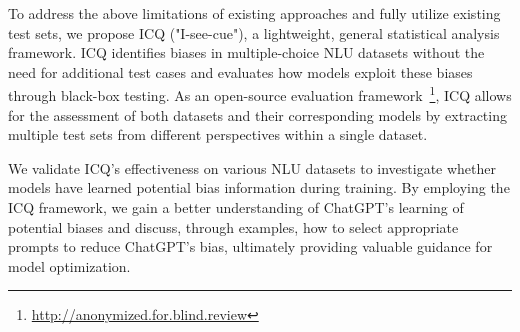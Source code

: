 %


To address the above limitations of existing approaches and 
fully utilize existing test sets, we propose ICQ ("I-see-cue"), 
a lightweight, general statistical analysis framework. 
ICQ identifies biases in multiple-choice NLU datasets 
without the need for additional test cases and evaluates 
how models exploit these biases through black-box testing. 
As an open-source evaluation framework~\footnote{\url{http://anonymized.for.blind.review}}, 
ICQ allows for the assessment of both datasets and their 
corresponding models by extracting multiple test sets 
from different perspectives within a single dataset.

We validate ICQ's effectiveness on various NLU datasets 
to investigate whether models have learned potential bias 
information during training. 
By employing the ICQ framework, 
we gain a better understanding of ChatGPT's 
learning of potential biases and discuss, 
through examples, how to select appropriate prompts to 
reduce ChatGPT's bias, ultimately providing 
valuable guidance for model optimization.


